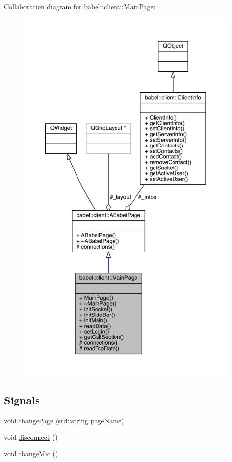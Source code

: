 Collaboration diagram for babel\+:\+:client\+:\+:Main\+Page\+:\nopagebreak
\begin{figure}[H]
\begin{center}
\leavevmode
\includegraphics[height=550pt]{classbabel_1_1client_1_1_main_page__coll__graph}
\end{center}
\end{figure}
\subsection*{Signals}
\begin{DoxyCompactItemize}
\item 
void \mbox{\hyperlink{classbabel_1_1client_1_1_main_page_a074e02d9bc1d546bf91428a2d32b91ba}{change\+Page}} (std\+::string page\+Name)
\item 
void \mbox{\hyperlink{classbabel_1_1client_1_1_main_page_a67ad5c452053020a9c04315d97d01a8b}{disconnect}} ()
\item 
void \mbox{\hyperlink{classbabel_1_1client_1_1_main_page_ac26005a5a71444e1f9d84852b642a5e3}{change\+Mic}} ()
\end{DoxyCompactItemize}
